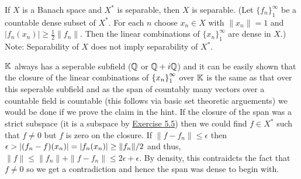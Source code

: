 \documentclass[12pt,a4paper]{article}
\begin{document}
\begin{problem}\label{prob:5-25}
If $X$ is a Banach space and $X^*$ is separable, then $X$ is separable. (Let $\{f_n\}_{1}^{\infty}$ be a countable dense subset of $X^*$. For each $n$ choose $x_n \in X$ with $\|x_n\| = 1$ and $|f_n(x_n)| \ge \frac{1}{2}\|f_n\|$. Then the linear combinations of $\{x_n\}_{1}^{\infty}$ are dense in $X$.) Note: Separability of $X$ does not imply separability of $X^*$.
\end{problem}
\begin{solution}
    $\mathbb{K}$ always has a seperable subfield ($\mathbb{Q}$ or $\mathbb{Q}+i\mathbb{Q}$) and it can be easily shown that the closure of the linear combinations of $ \qty{x_n}_1^\infty$ over $\mathbb{K}$ is the same as that over this seperable subfield and as the span of countably many vectors over a countable field is countable (this follows via basic set theoretic arguements) we would be done if we prove the claim in the hint. 
    If the closure of the span was a strict subspace (it is a subspace by \hyperref[prob:5-5]{Exercise 5.5}) then we could find $f\in X^*$ such that $f\neq 0$ but $f$ is zero on the closure. 
    If $\|f-f_n\|\leq\epsilon$ then $\epsilon>|(f_n-f)(x_n)|=|f_n(x_n)|\geq\|f_n\|/2$ and thus, $\|f\|\leq\|f_n\|+\|f-f_n\|\leq 2\epsilon+\epsilon$. 
    By density, this contraidcts the fact that $f\neq 0$ so we get a contradiction and hence the span was dense to begin with. 
\end{solution}
\end{document}
